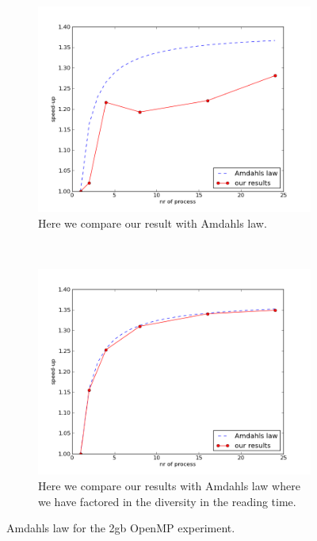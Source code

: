 \documentclass[a4paper,10pt]{article}
\begin{document}
\begin{figure}[h!t]
        \centering
        \begin{subfigure}[b]{0.70\textwidth}
                \centering
                \includegraphics[width=\textwidth]{graphics/mpio2gb_take2/Amdahls_law.png}
                \caption{Here we compare our result with Amdahls law.}
                \label{fig:mpio2_amad1}
        \end{subfigure}%
        \\
        \begin{subfigure}[b]{0.70\textwidth}
                \centering
                \includegraphics[width=\textwidth]{graphics/mpio2gb_take2/Amdahls_law2.png}
                \caption{Here we compare our results with Amdahls law where we have factored in
                         the diversity in the reading time.}
                \label{fig:mpio2_amad2}
        \end{subfigure}
        \caption{Amdahls law for the 2gb OpenMP experiment.}
\end{figure}
\end{document}
